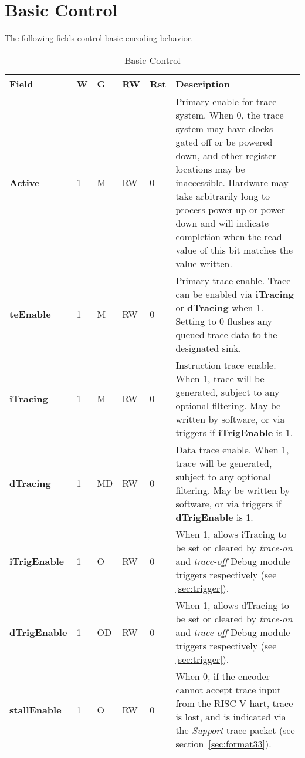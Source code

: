 \section{Basic Control} \label{sec:ctl-basic}

The following fields control basic encoding behavior.

\begin{table}[htp]
  \centering
  \caption{Basic Control}
  \label{tab:ctl-basic}
  \begin{tabulary}{\textwidth}{|l|l|l|l|l|p{90mm}|}
    \hline
    {\bf Field} & {\bf W} & {\bf G} & {\bf RW} & {\bf Rst} & {\bf Description} \\
    \hline
    \textbf{Active} & 1 & M & RW & 0 & Primary enable for trace system.  When 0, the trace system may have clocks gated off or be powered down,
     and other register locations may be inaccessible.
      Hardware may take arbitrarily long to process power-up or power-down and will indicate completion when the read value of this bit
      matches the value written.\\
    \hline
    \textbf{teEnable} & 1 & M & RW & 0 & 
      Primary trace enable.  Trace can be enabled via \textbf{iTracing}
      or \textbf{dTracing} when 1. Setting to 0 flushes any queued trace data to the designated sink.\\
    \hline
    \textbf{iTracing} & 1 & M & RW & 0 & Instruction trace enable.  When 1, trace will be generated,
       subject to any optional filtering.  May be written by software, or via triggers if \textbf{iTrigEnable} is 1.  \\
    \hline
    \textbf{dTracing} & 1 & MD & RW & 0 & Data trace enable.  When 1, trace will be generated,
       subject to any optional filtering.  May be written by software, or via triggers if \textbf{dTrigEnable} is 1.  \\
    \hline
    \textbf{iTrigEnable} & 1 & O & RW & 0 & When 1, allows iTracing to be set or cleared by \textit{trace-on} and \textit{trace-off} 
      Debug module triggers respectively (see \ref{sec:trigger}).\\
    \hline
    \textbf{dTrigEnable} & 1 & OD & RW & 0 & When 1, allows dTracing to be set or cleared by \textit{trace-on} and \textit{trace-off} 
      Debug module triggers respectively (see \ref{sec:trigger}).\\
    \hline
    \textbf{stallEnable} & 1 & O & RW & 0 & When 0, if the encoder cannot accept trace input from the RISC-V hart, trace is lost, and is
      indicated via the \textit{Support} trace packet (see section~\ref{sec:format33}).\newline

\end{tabulary}
\end{table}

